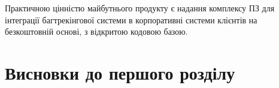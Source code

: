 \documentclass[../main.tex]{subfiles}
\begin{document}
Практичною цінністю майбутнього продукту є надання комплексу ПЗ для інтеграції багтрекінгової системи в корпоративні системи клієнтів на безкоштовній основі, з відкритою кодовою базою.

\section{Висновки до першого розділу}
\end{document}
